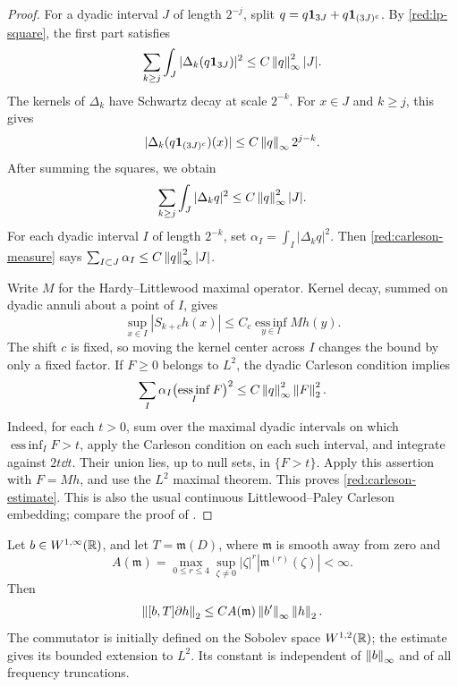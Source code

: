 \begin{proof}
For a dyadic interval \(J\) of length \(2^{-j}\), split
\(q=q\mathbf 1_{3J}+q\mathbf 1_{(3J)^c}\). By
\eqref{red:lp-square}, the first part satisfies
\[
 \sum_{k\ge j}\int_J
       |\Delta_k(q\mathbf 1_{3J})|^2
       \le C\left\|q\right\|_\infty^2|J|.
\]
The kernels of \(\Delta_k\) have Schwartz decay at scale
\(2^{-k}\). For \(x\in J\) and \(k\ge j\), this gives
\[
 |\Delta_k(q\mathbf 1_{(3J)^c})(x)|
     \le C\left\|q\right\|_\infty 2^{j-k}.
\]
After summing the squares, we obtain
\begin{equation}\label{red:carleson-measure}
 \sum_{k\ge j}\int_J|\Delta_kq|^2
          \le C\left\|q\right\|_\infty^2|J|.
\end{equation}
For each dyadic interval \(I\) of length \(2^{-k}\), set
\(\alpha_I=\int_I|\Delta_kq|^2\). Then
\eqref{red:carleson-measure} says
\(\sum_{I\subset J}\alpha_I\le C\left\|q\right\|_\infty^2|J|\).

Write \(M\) for the Hardy--Littlewood maximal operator. Kernel
decay, summed on dyadic annuli about a point of \(I\), gives
\[
 \sup_{x\in I}|S_{k+c}h(x)|
       \le C_c\operatorname*{ess\,inf}_{y\in I}Mh(y).
\]
The shift \(c\) is fixed, so moving the kernel center across \(I\)
changes the bound by only a fixed factor. If \(F\ge0\) belongs to
\(L^2\), the dyadic Carleson condition implies
\[
 \sum_I\alpha_I
     \bigl(\operatorname*{ess\,inf}_I F\bigr)^2
       \le C\left\|q\right\|_\infty^2\left\|F\right\|_2^2.
\]
Indeed, for each \(t>0\), sum over the maximal dyadic intervals
on which \(\operatorname*{ess\,inf}_I F>t\), apply the Carleson
condition on each such interval, and integrate against \(2t\dd t\).
Their union lies, up to null sets, in \(\{F>t\}\).
Apply this assertion with \(F=Mh\), and use the \(L^2\) maximal
theorem. This proves \eqref{red:carleson-estimate}. This is also the
usual continuous Littlewood--Paley Carleson embedding; compare the
proof of \cite[Proposition~4.1]{Tao2007Notes6}.
\end{proof}

\begin{lemma}\label{red:commutator}
Let \(b\in W^{1,\infty}(\mathbb R)\), and let \(T=\mathfrak m(D)\),
where \(\mathfrak m\) is smooth away from zero and
\[
 A(\mathfrak m)
   =\max_{0\le r\le4}\sup_{\zeta\ne0}
        |\zeta|^r|\mathfrak m^{(r)}(\zeta)|<\infty.
\]
Then
\begin{equation}\label{red:commutator-estimate}
 \left\|[b,T]\partial h\right\|_2
    \le C A(\mathfrak m)\left\|b'\right\|_\infty\left\|h\right\|_2.
\end{equation}
The commutator is initially defined on the Sobolev space
\(W^{1,2}(\mathbb R)\); the estimate gives its bounded extension to
\(L^2\). Its constant is independent
of \(\left\|b\right\|_\infty\) and of all frequency truncations.
\end{lemma}

